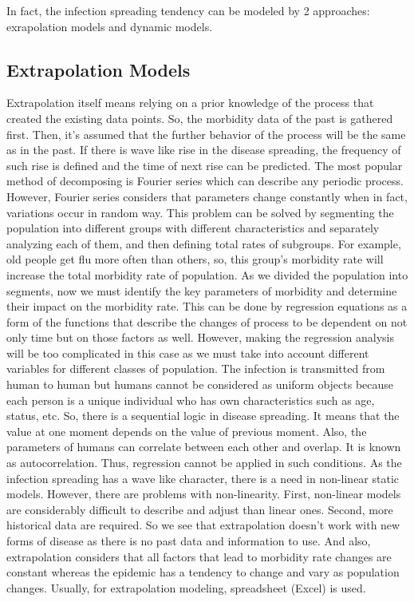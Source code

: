 In fact, the infection spreading tendency can be modeled by 2 approaches: exrapolation models and dynamic models.


\subsection{Extrapolation Models}

Extrapolation itself means relying on a prior knowledge of the process that created the existing data points. So, the morbidity data of the past is gathered first. Then, it’s assumed that the further behavior of the process will be the same as in the past. If there is wave like rise in the disease spreading, the frequency of such rise is defined and the time of next rise can be predicted. The most popular method of decomposing is Fourier series which can describe any periodic process. However, Fourier series considers that parameters change constantly when in fact, variations occur in random way. This problem can be solved by segmenting the population into different groups with different characteristics and separately analyzing each of them, and then defining total rates of subgroups. For example, old people get flu more often than others, so, this group’s morbidity rate will increase the total morbidity rate of population. As we divided the population into segments, now we must identify the key parameters of morbidity and determine their impact on the morbidity rate. This can be done by regression equations as a form of the functions that describe the changes of process to be dependent on not only time but on those factors as well. However, making the regression analysis will be too complicated in this case as we must take into account different variables for different classes of population. The infection is transmitted from human to human but humans cannot be considered as uniform objects because each person is a unique individual who has own characteristics such as age, status, etc. So, there is a sequential logic in disease spreading. It means that the value at one moment depends on the value of previous moment. Also, the parameters of humans can correlate between each other and overlap. It is known as autocorrelation. Thus, regression cannot be applied in such conditions.  As the infection spreading has a wave like character, there is a need in non-linear static models.  However, there are problems with non-linearity. First, non-linear models are considerably difficult to describe and adjust than linear ones. Second, more historical data are required.
So we see that extrapolation doesn’t work with new forms of disease as there is no past data and information to use. And also, extrapolation considers that all factors that lead to morbidity rate changes are constant whereas the epidemic has a tendency to change and vary as population changes. Usually, for extrapolation modeling, spreadsheet (Excel) is used.



